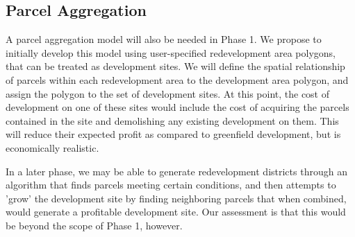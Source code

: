 \subsection{Parcel Aggregation}
A parcel aggregation model will also be needed in Phase 1.  We
propose to initially develop this model using user-specified
redevelopment area polygons, that can be treated as development
sites.  We will define the spatial relationship of parcels within
each redevelopment area to the development area polygon, and assign
the polygon to the set of development sites.  At this point, the
cost of development on one of these sites would include the cost of
acquiring the parcels contained in the site and demolishing any
existing development on them.  This will reduce their expected
profit as compared to greenfield development, but is economically
realistic.

In a later phase, we may be able to generate redevelopment districts
through an algorithm that finds parcels meeting certain conditions,
and then attempts to 'grow' the development site by finding
neighboring parcels that when combined, would generate a profitable
development site.  Our assessment is that this would be beyond the
scope of Phase 1, however.
